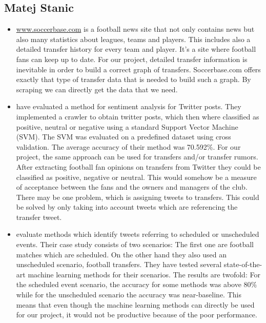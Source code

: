 \documentclass{article}
\begin{document}
\subsection{Matej Stanic}
\begin{itemize}
	\item \url{www.soccerbase.com} is a football news site that not only contains news but also many statistics about leagues, teams and players. This includes also a detailed transfer history for every team and player. It's a site where football fans can keep up to date. For our project, detailed transfer information is inevitable in order to build a correct graph of transfers. Soccerbase.com offers exactly that type of transfer data that is needed to build such a graph. By scraping we can directly get the data that we need.
	\item \cite{Shrivatava2014} have evaluated a method for sentiment analysis for Twitter posts. They implemented a crawler to obtain twitter posts, which then where classified as positive, neutral or negative using a standard Support Vector Machine (SVM). The SVM was evaluated on a predefined dataset using cross validation. The average accuracy of their method was 70.592\%. For our project, the same approach can be used for transfers and/or transfer rumors. After extracting football fan opinions on transfers from Twitter they could be classified as positive, negative or neutral. This would somehow be a measure of acceptance between the fans and the owners and managers of the club. There may be one problem, which is assigning tweets to transfers. This could be solved by only taking into account tweets which are referencing the transfer tweet.
	\item \cite{Kunneman+12} evaluate methods which identify tweets referring to scheduled or unscheduled events. Their case study consists of two scenarios: The first one are football matches which are scheduled. On the other hand they also used an unscheduled scenario, football transfers. They have tested several state-of-the-art machine learning methods for their scenarios. The results are twofold: For the scheduled event scenario, the accuracy for some methods was above 80\% while for the unscheduled scenario the accuracy was near-baseline. This means that even though the machine learning methods can directly be used for our project, it would not be productive because of the poor performance. 
\end{itemize}



\end{document}
